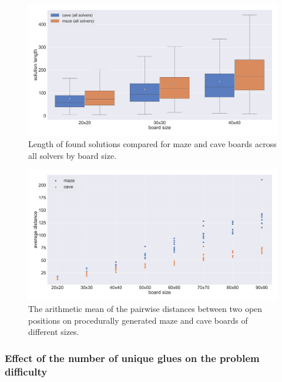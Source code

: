 \begin{figure}[htpb]
\centering
\includegraphics[width=\textwidth]{figures/plots/heuristic_solvers_i1/maze_vs_cave_solution_length.pdf}
\caption[Solution length by board type]{Length of found solutions compared for maze and cave boards across all solvers by board size.}
\label{fig:maze_vs_cave_solution_length}
\end{figure}

\begin{figure}[htpb]
\centering
\includegraphics[width=\textwidth]{figures/plots/average_distance_cave_vs_maze.pdf}
\caption[Average pairwise distance on maze and cave boards]{The arithmetic mean of the pairwise distances between two open positions on procedurally generated maze and cave boards of different sizes.}
\label{fig:maze_vs_cave_average_distance}
\end{figure}

\vfill
\newpage

\subsubsection{Effect of the number of unique glues on the problem difficulty}

